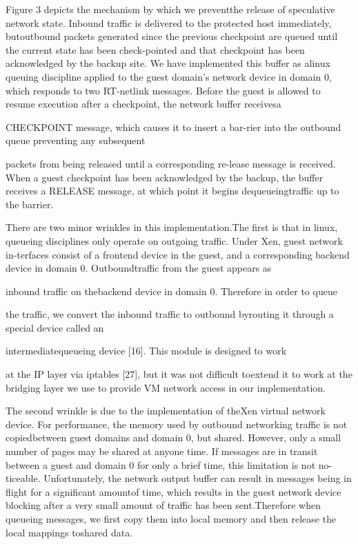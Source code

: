 Figure 3 depicts the mechanism by which we preventthe release of speculative network state. Inbound traffic is delivered to the protected host immediately, butoutbound packets generated since the previous checkpoint are queued until the current state has been check-pointed and that checkpoint has been acknowledged by
the backup site. We have implemented this buffer as alinux queuing discipline applied to the guest domain's
network device in domain 0, which responds to two RT-netlink messages. Before the guest is allowed to resume
execution after a checkpoint, the network buffer receivesa

CHECKPOINT message, which causes it to insert a bar-rier into the outbound queue preventing any subsequent

packets from being released until a corresponding re-lease message is received. When a guest checkpoint has
been acknowledged by the backup, the buffer receives a
RELEASE message, at which point it begins dequeueingtraffic up to the barrier.

There are two minor wrinkles in this implementation.The first is that in linux, queueing disciplines only operate on outgoing traffic. Under Xen, guest network in-terfaces consist of a frontend device in the guest, and a
corresponding backend device in domain 0. Outboundtraffic from the guest appears as

inbound traffic on thebackend device in domain 0. Therefore in order to queue

the traffic, we convert the inbound traffic to outbound byrouting it through a special device called an

intermediatequeueing device [16]. This module is designed to work

at the IP layer via iptables [27], but it was not difficult toextend it to work at the bridging layer we use to provide
VM network access in our implementation.

The second wrinkle is due to the implementation of theXen virtual network device. For performance, the memory used by outbound networking traffic is not copiedbetween guest domains and domain 0, but shared. However, only a small number of pages may be shared at anyone time. If messages are in transit between a guest and
domain 0 for only a brief time, this limitation is not no-ticeable. Unfortunately, the network output buffer can
result in messages being in flight for a significant amountof time, which results in the guest network device blocking after a very small amount of traffic has been sent.Therefore when queueing messages, we first copy them
into local memory and then release the local mappings toshared data.

